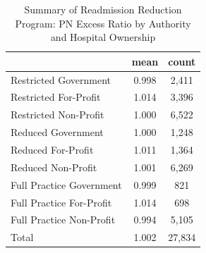 \begin{table}[htbp]\centering
\def\sym#1{\ifmmode^{#1}\else\(^{#1}\)\fi}
\caption{Summary of Readmission Reduction Program: PN Excess Ratio by Authority and Hospital Ownership}
\begin{tabular}{l*{1}{cc}}
\toprule
                    &        mean&       count\\
\midrule
Restricted Government&       0.998&       2,411\\
Restricted For-Profit&       1.014&       3,396\\
Restricted Non-Profit&       1.000&       6,522\\
Reduced Government  &       1.000&       1,248\\
Reduced For-Profit  &       1.011&       1,364\\
Reduced Non-Profit  &       1.001&       6,269\\
Full Practice Government&       0.999&         821\\
Full Practice For-Profit&       1.014&         698\\
Full Practice Non-Profit&       0.994&       5,105\\
Total               &       1.002&      27,834\\
\bottomrule
\end{tabular}
\end{table}
